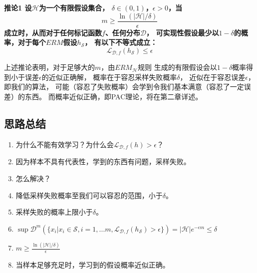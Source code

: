 \documentclass[UTF8]{ctexart}
\begin{document}
\textbf{
推论1 设$\mathcal{H}$为一个有限假设集合，
$\delta\in(0,1)$，$\epsilon>0$，当
$$
m \geq \frac{\ln(|\mathcal{H}|/\delta)}{\epsilon}
$$
成立时，从而对于任何标记函数$f$、任何分布$\mathcal{D}$，
可实现性假设最少以$1-\delta$的概率，对于每个$ERM$假设$h_{\mathcal{S}}$，
有以下不等式成立：
$$
\mathcal{L}_{\mathcal{D},f}(h_{\mathcal{S}})\leq\epsilon
$$
}

上述推论表明，对于足够大的$m$，由${ERM}_{\mathcal{H}}$规则
生成的有限假设会以$1-\delta$概率得到小于误差$\epsilon$的近似正确解，
概率在于容忍采样失败概率$\delta$，
近似在于容忍误差$\epsilon$，
即我们的算法，
可能（容忍了失败概率）会学到令我们基本满意（容忍了一定误差）的东西。
而概率近似正确，即PAC理论，将在第二章详述。

\subsection{思路总结}
\begin{enumerate}
\item 为什么不能有效学习？为什么会$\mathcal{L}_{\mathcal{D},f}(h)>\epsilon$？
\item 因为样本不具有代表性，学到的东西有问题，采样失败。
\item 怎么解决？
\item 降低采样失败概率至我们可以容忍的范围，小于$\delta$。
\item 采样失败的概率上限小于$\delta$。
\item $\sup{\mathcal{D}^m
(\{x_i|x_i\in\mathcal{S},i=1,...m,
\mathcal{L}_{\mathcal{D},f}(h_{\mathcal{S}})>\epsilon
\})}=|\mathcal{H}|e^{-\epsilon m}\leq \delta$
\item $m \geq \frac{\ln(|\mathcal{H}|/\delta)}{\epsilon}$
\item 当样本足够充足时，学习到的假设概率近似正确。
\end{enumerate}
\end{document}
